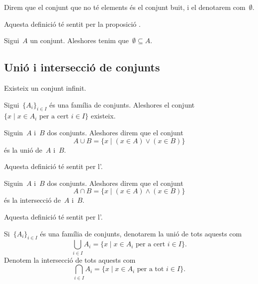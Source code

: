 \documentclass[../../main.tex]{subfiles}
\begin{document}
    \begin{definition}
        Direm que el conjunt que no té elements és el conjunt buit, i el denotarem com~\(\emptyset\).

        Aquesta definició té sentit per la proposició .
    \end{definition}
    \begin{axiom}
        \label{axiom:axioma de regularitat}
        Sigui~\(A\) un conjunt.
        Aleshores tenim que~\(\emptyset\subseteq A\).
    \end{axiom}
    \subsection{Unió i intersecció de conjunts}
    \begin{axiom}
        Existeix un conjunt infinit.
    \end{axiom}
    \begin{axiom}
        \label{axiom:axioma de la unió}
        Sigui~\(\{A_{i}\}_{i\in I}\) és una família de conjunts.
        Aleshores el conjunt~\(\{x\mid x\in A_{i}\text{ per a cert }i\in I\}\) existeix.
    \end{axiom}
    \begin{definition}
        \label{def:unió de conjunts}
        Siguin~\(A\) i~\(B\) dos conjunts.
        Aleshores direm que el conjunt
        \[
            A\cup B=\{x\mid(x\in A)\lor(x\in B)\}
        \]
        és la unió de~\(A\) i~\(B\).

        Aquesta definició té sentit per l'.
    \end{definition}
    \begin{definition}
        \label{def:intersecció de conjunts}
        Siguin~\(A\) i~\(B\) dos conjunts.
        Aleshores direm que el conjunt
        \[
            A\cap B=\{x\mid(x\in A)\land(x\in B)\}
        \]
        és la intersecció de~\(A\) i~\(B\).

        Aquesta definició té sentit per l'.
    \end{definition}
    \begin{notation}
        Si~\(\{A_{i}\}_{i\in I}\) és una família de conjunts, denotarem la unió de tots aquests com
        \[
            \bigcup_{i\in I}A_{i}=\{x\mid x\in A_{i}\text{ per a cert }i\in I\}.
        \]
        Denotem la intersecció de tots aquests com
        \[
            \bigcap_{i\in I}A_{i}=\{x\mid x\in A_{i}\text{ per a tot }i\in I\}.
        \]
    \end{notation}
\end{document}
